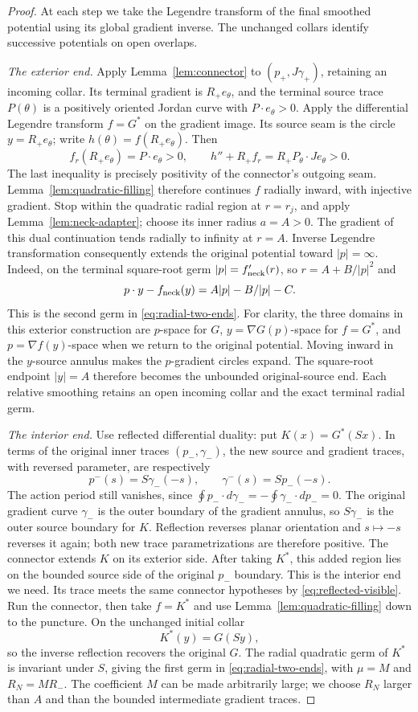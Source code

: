 \documentclass[11pt]{amsart}
\theoremstyle{definition}
\theoremstyle{remark}
\numberwithin{equation}{section}
\begin{document}
\begin{proof}
At each step we take the Legendre transform of the final smoothed
potential using its global gradient inverse. The unchanged collars
identify successive potentials on open overlaps.

\emph{The exterior end.}
Apply Lemma~\ref{lem:connector} to $(p_+,J\gamma_+)$, retaining an
incoming collar. Its terminal gradient is $R_+e_\theta$, and the
terminal source trace $P(\theta)$ is a positively oriented Jordan curve with
$P\cdot e_\theta>0$. Apply the differential Legendre transform
$f=G^*$ on the gradient image. Its source seam is the circle
$y=R_+e_\theta$; write $h(\theta)=f(R_+e_\theta)$. Then
\[
 f_r(R_+e_\theta)=P\cdot e_\theta>0,\qquad
 h''+R_+f_r=R_+ P_\theta\cdot Je_\theta>0.
\]
The last inequality is precisely positivity of the connector's
outgoing seam. Lemma~\ref{lem:quadratic-filling} therefore continues
$f$ radially inward, with injective gradient. Stop within the
quadratic radial region at $r=r_j$, and apply
Lemma~\ref{lem:neck-adapter}; choose its inner radius $a=A>0$.
The gradient of this dual continuation tends radially to infinity at
$r=A$. Inverse Legendre transformation consequently extends the
original potential toward $|p|=\infty$. Indeed, on the terminal
square-root germ $|p|=f_{\rm neck}'(r)$, so
$r=A+B/|p|^2$ and
\[
 p\cdot y-f_{\rm neck}(y)=A|p|-B/|p|-C.
\]
This is the second germ in \eqref{eq:radial-two-ends}.
For clarity, the three domains in this exterior construction are
$ p $-space for $G$, $y=\nabla G(p)$-space for $f=G^*$, and
$p=\nabla f(y)$-space when we return to the original potential.
Moving inward in the $y$-source annulus makes the $p$-gradient
circles expand. The square-root endpoint $|y|=A$ therefore becomes
the unbounded original-source end. Each relative smoothing retains
an open incoming collar and the exact terminal radial germ.

\emph{The interior end.}
Use reflected differential duality: put $K(x)=G^*(Sx)$. In terms
of the original inner traces $(p_-,\gamma_-)$, the new source and
gradient traces, with reversed parameter, are respectively
\[
 p^-(s)=S\gamma_-(-s),\qquad \gamma^-(s)=Sp_-(-s).
\]
The action period still vanishes, since
$\oint p_-\cdot d\gamma_-=-\oint\gamma_-\cdot dp_-=0$.
The original gradient curve $\gamma_-$ is the outer boundary
of the gradient annulus, so $S\gamma_-$ is the outer source boundary
for $K$. Reflection reverses planar orientation and $s\mapsto-s$
reverses it again; both new trace parametrizations are therefore
positive. The connector extends $K$ on its exterior side. After
taking $K^*$, this added region lies on the bounded source side of
the original $p_-$ boundary. This is the interior end we need. Its trace meets the same connector
hypotheses by \eqref{eq:reflected-visible}. Run the connector, then
take $f=K^*$ and use Lemma~\ref{lem:quadratic-filling} down to the
puncture. On the unchanged initial collar
\[
 K^*(y)=G(Sy),
\]
so the inverse reflection recovers the original $G$. The radial
quadratic germ of $K^*$ is invariant under $S$, giving the first
germ in \eqref{eq:radial-two-ends}, with $\mu=M$ and $R_N=MR_-$.
The coefficient $M$ can be made arbitrarily large; we choose $R_N$ larger than
$A$ and than the bounded intermediate gradient traces.


\end{proof}
\end{document}
